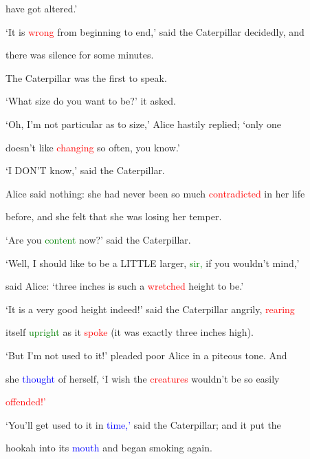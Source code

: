  have got altered.’



 ‘It is \textcolor{red}{wrong} from beginning to end,’ said the Caterpillar decidedly, and

 there was silence for some minutes.



 The Caterpillar was the first to speak.



 ‘What size do you want to be?’ it asked.



 ‘Oh, I’m not particular as to size,’ Alice hastily replied; ‘only one

 doesn’t like \textcolor{red}{changing} so often, you know.’



 ‘I DON’T know,’ said the Caterpillar.



 Alice said nothing: she had never been so much \textcolor{red}{contradicted} in her life

 before, and she felt that she was \textcolor{BurntOrange}{losing} her temper.



 ‘Are you \textcolor{green}{content} now?’ said the Caterpillar.



 ‘Well, I should like to be a LITTLE larger, \textcolor{green}{sir,} if you wouldn’t mind,’

 said Alice: ‘three inches is such a \textcolor{red}{wretched} height to be.’



 ‘It is a very \textcolor{BurntOrange}{good} height indeed!’ said the Caterpillar angrily, \textcolor{red}{rearing}

 itself \textcolor{green}{upright} as it \textcolor{red}{spoke} (it was exactly three inches high).



 ‘But I’m not used to it!’ pleaded poor Alice in a piteous tone. And

 she \textcolor{blue}{thought} of herself, ‘I wish the \textcolor{red}{creatures} wouldn’t be so easily

 \textcolor{red}{offended!’}



 ‘You’ll get used to it in \textcolor{blue}{time,’} said the Caterpillar; and it put the

 hookah into its \textcolor{blue}{mouth} and began smoking again.




